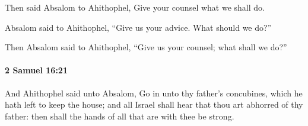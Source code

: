 			\begin{versebox}
					\item[BHS] 
					\item[ASV] Then said Absalom to Ahithophel, Give your counsel what we shall do.
					\item[NIV] Absalom said to Ahithophel, “Give us your advice. What should we do?”
					\item[NRSV] Then Absalom said to Ahithophel, “Give us your counsel; what shall we do?”
			\end{versebox}

		\paragraph{2 Samuel 16:21} %
			\label{2SAMUEL-16-21}

			And Ahithophel said unto Absalom, Go in unto thy father’s concubines, which he hath left to keep the house; and all Israel shall hear that thou art abhorred of thy father: then shall the hands of all that are with thee be strong.

